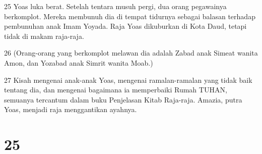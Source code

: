 \par 25 Yoas luka berat. Setelah tentara musuh pergi, dua orang pegawainya berkomplot. Mereka membunuh dia di tempat tidurnya sebagai balasan terhadap pembunuhan anak Imam Yoyada. Raja Yoas dikuburkan di Kota Daud, tetapi tidak di makam raja-raja.
\par 26 (Orang-orang yang berkomplot melawan dia adalah Zabad anak Simeat wanita Amon, dan Yozabad anak Simrit wanita Moab.)
\par 27 Kisah mengenai anak-anak Yoas, mengenai ramalan-ramalan yang tidak baik tentang dia, dan mengenai bagaimana ia memperbaiki Rumah TUHAN, semuanya tercantum dalam buku Penjelasan Kitab Raja-raja. Amazia, putra Yoas, menjadi raja menggantikan ayahnya.

\chapter{25}

